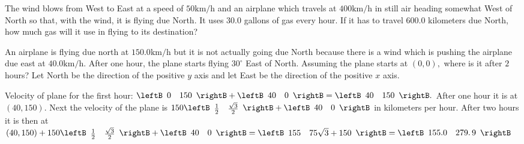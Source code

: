 \begin{enumialphparenastyle}
\begin{ex} The wind blows from West to East at a speed of $50\textrm{km}/\textrm{h}$ and
an airplane which travels at $400\textrm{km}/\textrm{h}$ in still air heading
somewhat West of North so that, with the wind, it is flying due North. It
uses $30.0$ gallons of gas every hour. If it has to travel $600.0$ kilometers due
North, how much gas will it use in flying to its destination? \vspace{1mm}
\end{ex}

\begin{ex} An airplane is flying due north at $150.0\textrm{km}/\textrm{h}$ but it is
not actually going due North because there is a wind which is pushing the
airplane due east at $40.0\textrm{km}/\textrm{h}$. After one hour, the plane starts
flying $30^{\circ }$ East of North. Assuming the plane starts at $\left(
0,0\right) ,$ where is it after $2$ hours? Let North be the direction of the
positive $y$ axis and let East be the direction of the positive $x$ axis.
\vspace{1mm}
\begin{sol}
 Velocity of plane for the first hour: $\leftB \begin{array}{cc} 
0 & 150
\end{array}
\rightB  + \leftB \begin{array}{cc}
40 & 0
\end{array}
\rightB =\leftB
\begin{array}{cc}
40 & 150
\end{array}
\rightB .$ After one hour it is at $\left( 40,150\right) .$ Next the
velocity of the plane is $150\leftB \begin{array}{cc}
 \frac{1}{2} & \frac{\sqrt{3}}{2}
\end{array}
\rightB
+\leftB
\begin{array}{cc}
 40 & 0
\end{array}
\rightB $ in kilometers per hour. After two hours it is then at 
$\left( 40,150\right) + 150\leftB \begin{array}{cc}
 \frac{1}{2} & \frac{\sqrt{3}}{2}
\end{array}
\rightB
+\leftB
\begin{array}{cc}
 40 & 0
\end{array}
\rightB  =  \leftB
\begin{array}{cc}
155 & 75\sqrt{3}+150
\end{array}
\rightB = \leftB
\begin{array}{cc}
155.0 & 279.\,\allowbreak 9
\end{array}
\rightB $
\end{sol}
\end{ex}


\end{enumialphparenastyle}
